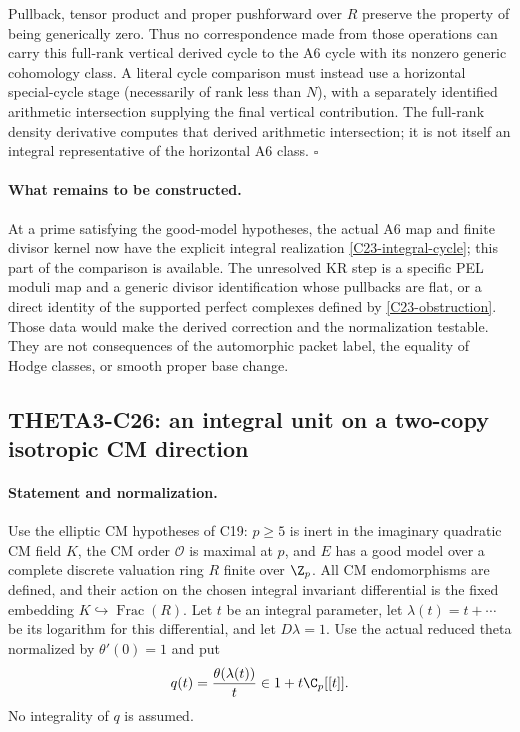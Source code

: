 \documentclass[11pt]{article}
\theoremstyle{definition}\newtheorem{definition}[theorem]{Definition}\newtheorem{remark}[theorem]{Remark}
\begin{document}
Pullback, tensor product and proper pushforward over $R$
preserve the property of being generically zero.
Thus no correspondence made from those operations can carry
this full-rank vertical derived cycle to the A6 cycle with
its nonzero generic cohomology class.
A literal cycle comparison must instead use a horizontal
special-cycle stage (necessarily of rank less than $N$),
with a separately identified arithmetic intersection supplying
the final vertical contribution.
The full-rank density derivative computes that derived
arithmetic intersection; it is not itself an integral
representative of the horizontal A6 class.
\hfill$\square$

\paragraph{What remains to be constructed.}
At a prime satisfying the good-model hypotheses, the actual
A6 map and finite divisor kernel now have the explicit
integral realization \eqref{C23-integral-cycle}; this part of
the comparison is available.  The unresolved KR step is a
specific PEL moduli map and a generic divisor identification
whose pullbacks are flat, or a direct identity of the
supported perfect complexes defined by
\eqref{C23-obstruction}.  Those data would make the
derived correction and the normalization testable.
They are not consequences of the automorphic packet label,
the equality of Hodge classes, or smooth proper base change.


\subsection{THETA3-C26: an integral unit on a two-copy isotropic CM direction}\label{C26}

\paragraph{Statement and normalization.}
Use the elliptic CM hypotheses of C19: $p\geq5$ is inert in the
imaginary quadratic CM field $K$, the CM order $\mathcal O$ is
maximal at $p$, and $E$ has a good model over a complete discrete
valuation ring $R$ finite over $\Z_p$.  All CM endomorphisms are
defined, and their action on the chosen integral invariant
differential is the fixed embedding $K\hookrightarrow\operatorname{Frac}(R)$.
Let $t$ be an integral parameter, let $\lambda(t)=t+\cdots$
be its logarithm for this differential, and let $D\lambda=1$.
Use the actual reduced theta normalized by $\theta'(0)=1$ and put
\[
 q(t)=\frac{\theta(\lambda(t))}{t}\in1+t\C_p[[t]].
\]
No integrality of $q$ is assumed.
\end{document}
